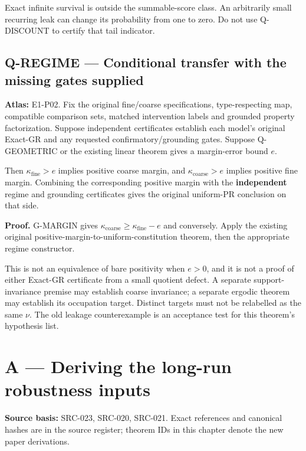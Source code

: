 \documentclass[
  11pt,
  a4paper,
]{article}
\begin{document}
Exact infinite survival is outside the summable-score class. An
arbitrarily small recurring leak can change its probability from one to
zero. Do not use Q-DISCOUNT to certify that tail indicator.

\subsection{Q-REGIME --- Conditional transfer with the missing gates
supplied}\label{q-regime-conditional-transfer-with-the-missing-gates-supplied}

\textbf{Atlas:} E1-P02. Fix the original fine/coarse specifications,
type-respecting map, compatible comparison sets, matched intervention
labels and grounded property factorization. Suppose independent
certificates establish each model's original Exact-GR and any requested
confirmatory/grounding gates. Suppose Q-GEOMETRIC or the existing linear
theorem gives a margin-error bound \(e\).

Then \(\kappa_{\mathrm{fine}}>e\) implies positive coarse margin, and
\(\kappa_{\mathrm{coarse}}>e\) implies positive fine margin. Combining
the corresponding positive margin with the \textbf{independent} regime
and grounding certificates gives the original uniform-PR conclusion on
that side.

\textbf{Proof.} G-MARGIN gives
\(\kappa_{\mathrm{coarse}}\ge\kappa_{\mathrm{fine}}-e\) and conversely.
Apply the existing original positive-margin-to-uniform-constitution
theorem, then the appropriate regime constructor.

This is not an equivalence of bare positivity when \(e>0\), and it is
not a proof of either Exact-GR certificate from a small quotient defect.
A separate support-invariance premise may establish coarse invariance; a
separate ergodic theorem may establish its occupation target. Distinct
targets must not be relabelled as the same \(\nu\). The old leakage
counterexample is an acceptance test for this theorem's hypothesis list.

\newpage

\section{A --- Deriving the long-run robustness
inputs}\label{a-deriving-the-long-run-robustness-inputs}

\textbf{Source basis:} SRC-023, SRC-020, SRC-021. Exact references and
canonical hashes are in the source register; theorem IDs in this chapter
denote the new paper derivations.
\end{document}
